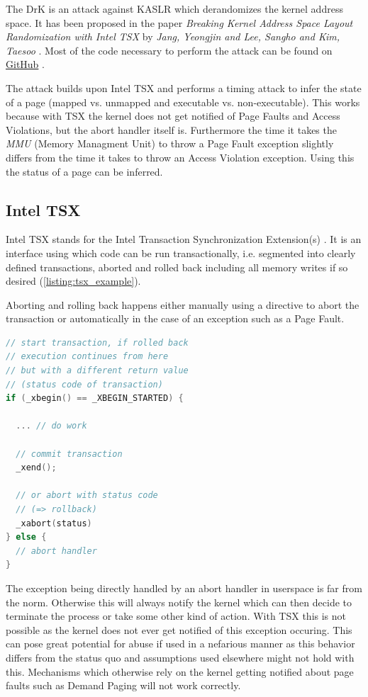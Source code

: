 The DrK is an attack against KASLR which derandomizes the kernel address space.
It has been proposed in the paper \textit{Breaking Kernel Address Space Layout Randomization with Intel TSX} by \textit{Jang, Yeongjin and Lee, Sangho and Kim, Taesoo} \cite{drk}.
Most of the code necessary to perform the attack can be found on \href{https://github.com/sslab-gatech/DrK}{GitHub} \cite{drk-attack-proof-of-concept-github}.

The attack builds upon Intel TSX and performs a timing attack to infer the state of a page (mapped vs. unmapped and executable vs. non-executable).
This works because with TSX the kernel does not get notified of Page Faults and Access Violations, but the abort handler itself is.
Furthermore the time it takes the \textit{MMU} (Memory Managment Unit) to throw a Page Fault exception slightly differs from the time it takes to throw an Access Violation exception.
Using this the status of a page can be inferred.\cite{drk}

\subsection{Intel TSX}

Intel TSX stands for the Intel Transaction Synchronization Extension(s) \cite{intel-tsx-overview}.
It is an interface using which code can be run transactionally, i.e. segmented into clearly defined transactions, aborted and rolled back including all memory writes if so desired (\autoref{listing:tsx_example}).

Aborting and rolling back happens either manually using a directive to abort the transaction or automatically in the case of an exception such as a Page Fault.

\begin{lstlisting}[language=C, label=listing:tsx_example, caption={Example code for Intel TSX}]
// start transaction, if rolled back
// execution continues from here
// but with a different return value
// (status code of transaction)
if (_xbegin() == _XBEGIN_STARTED) {

  ... // do work

  // commit transaction
  _xend();

  // or abort with status code
  // (=> rollback)
  _xabort(status)
} else {
  // abort handler
}
\end{lstlisting}

The exception being directly handled by an abort handler in userspace is far from the norm. Otherwise this will always notify the kernel which can then decide to terminate the process or take some other kind of action.
With TSX this is not possible as the kernel does not ever get notified of this exception occuring.
This can pose great potential for abuse if used in a nefarious manner as this behavior differs from the status quo and assumptions used elsewhere might not hold with this.
Mechanisms which otherwise rely on the kernel getting notified about page faults such as Demand Paging will not work correctly.\cite{drk}

